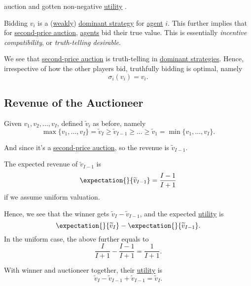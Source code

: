 \begin{itemize}
\begin{enumerate}
			      auction and gotten non-negative \hyperref[def:reward]{utility} .
	      \end{enumerate}
	      \begin{remark}\label{rmk:incentive-compatible}
		      Bidding \(v_i\) is a (\hyperref[def:weakly-dominant-strategy]{weakly}) \hyperref[def:dominant-strategy]{dominant strategy} for
		      \hyperref[def:player]{agent} \(i\). This further implies that for \hyperref[eg:second-price-auction]{second-price auction}, \hyperref[def:player]{agents} bid their true value.
		      This is essentially \emph{incentive compatibility}, or \emph{truth-telling desirable}.
	      \end{remark}
\end{itemize}

\begin{remark}
	We see that \hyperref[eg:second-price-auction]{second-price auction} is truth-telling in \hyperref[def:dominant-strategy]{dominant strategies}.
	Hence, irrespective of how the other players bid, truthfully bidding is optimal, namely
	\[
		\sigma_{i}(v_{i}) = v_{i}.
	\]
\end{remark}

\subsection{Revenue of the Auctioneer}
Given \(v_1, v_2, \ldots , v_I\), defined \(\widetilde{v}_i\) as before, namely
\[
	\max\{v_1, \ldots , v_I\} = \widetilde{v}_{I}\geq \widetilde{v}_{I-1}\geq \ldots \geq \widetilde{v}_1 = \min\{v_1, \ldots , v_I\}.
\]

And since it's a \hyperref[eg:second-price-auction]{second-price auction}, so the revenue is \(\widetilde{v}_{I - 1}\).

\begin{note}
	The expected revenue of \(\widetilde{v}_{I - 1}\) is
	\[
		\expectation{}{\widetilde{v}_{I-1}} = \frac{I-1}{I+1}
	\]
	if we assume uniform valuation.
\end{note}

Hence, we see that the winner gets \(\widetilde{v}_{I} - \widetilde{v}_{I-1}\), and the expected \hyperref[def:reward]{utility}  is
\[
	\expectation{}{\widetilde{v}_{I}} - \expectation{}{\widetilde{v}_{I - 1}}.
\]
In the uniform case, the above further equals to
\[
	\frac{I}{I+1} - \frac{I - 1}{I + 1} = \frac{1}{I+1}.
\]

With winner and auctioneer together, their \hyperref[def:reward]{utility}  is
\[
	\widetilde{v}_{I} - \widetilde{v}_{I - 1}+\widetilde{v}_{I - 1} = \widetilde{v}_{I}.
\]

